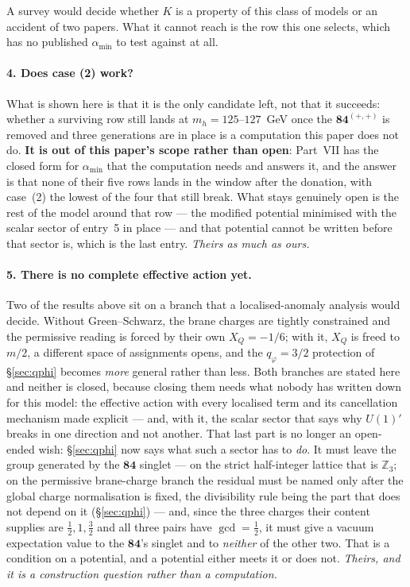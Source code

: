\documentclass[11pt,a4paper]{article}
\newcommand{\ZZ}{\mathbb{Z}}
\newcommand{\rep}[1]{\mathbf{#1}}
\newcommand{\amin}{\alpha_{\min}}
\begin{document}
A survey would decide whether $K$ is a property of this class of models or an accident of two
papers. What it cannot reach is the row this one selects, which has no published $\amin$ to test
against at all.

\paragraph{4. Does case (2) work?} What is shown here is that it is the only candidate left, not
that it succeeds: whether a surviving row still lands at $m_h=125$--$127$~GeV once the
$\rep{84}^{(+,+)}$ is removed and three generations are in place is a computation this paper does not
do. \textbf{It is out of this paper's scope rather than open}: Part~VII \cite{PartVII} has the closed
form for $\amin$ that the computation needs and answers it, and the answer is that none of their five
rows lands in the window after the donation, with case~(2) the lowest of the four that still break.
What stays genuinely open is the rest of the model around that row --- the modified potential
minimised with the scalar sector of entry~5 in place --- and that potential cannot be written
before that sector is, which is the last entry. \emph{Theirs as much as ours.}

\paragraph{5. There is no complete effective action yet.} Two of the results above sit on a
branch that a localised-anomaly analysis would decide. Without Green--Schwarz, the brane charges are
tightly constrained and the permissive reading is forced by their own $X_Q=-1/6$; with it, $X_Q$ is
freed to $m/2$, a different space of assignments opens, and the $q_\varphi=3/2$ protection of
\S\ref{sec:qphi} becomes \emph{more} general rather than less. Both branches are stated here and
neither is closed, because closing them needs what nobody has written down for this model: the
effective action with every localised term and its cancellation mechanism made explicit --- and, with
it, the scalar sector that says why $U(1)'$ breaks in one direction and not another. That last part
is no longer an open-ended wish: \S\ref{sec:qphi} now says what such a sector has to \emph{do}. It
must leave the group generated by the $\rep{84}$ singlet --- on the strict half-integer lattice that
is $\ZZ_3$; on the permissive brane-charge branch the residual must be named only after the global
charge normalisation is fixed, the divisibility rule being the part that does not depend on it
(\S\ref{sec:qphi}) --- and, since the three charges their content supplies are
$\tfrac12,1,\tfrac32$ and all three pairs have $\gcd=\tfrac12$, it must give a vacuum expectation
value to the $\rep{84}$'s singlet and to \emph{neither} of the other two. That is a condition on a
potential, and a potential either meets it or does not. \emph{Theirs, and it is a construction
question rather than a computation.}
\end{document}
